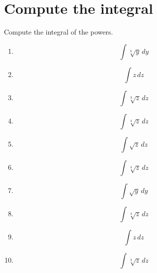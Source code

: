 \documentclass{article}
\begin{document}
        \section{Compute the integral}
        Compute the integral of the powers.
        \begin{multicols}{1}
        \begin{enumerate}
        \item $$\int \sqrt[3]{y}\, dy$$
\item $$\int z\, dz$$
\item $$\int \sqrt[3]{z}\, dz$$
\item $$\int \sqrt[4]{z}\, dz$$
\item $$\int \sqrt{z}\, dz$$
\item $$\int \sqrt[4]{z}\, dz$$
\item $$\int \sqrt{y}\, dy$$
\item $$\int \sqrt[4]{z}\, dz$$
\item $$\int z\, dz$$
\item $$\int \sqrt[3]{z}\, dz$$
        \end{enumerate}
        \end{multicols}
        

    
\end{document}
